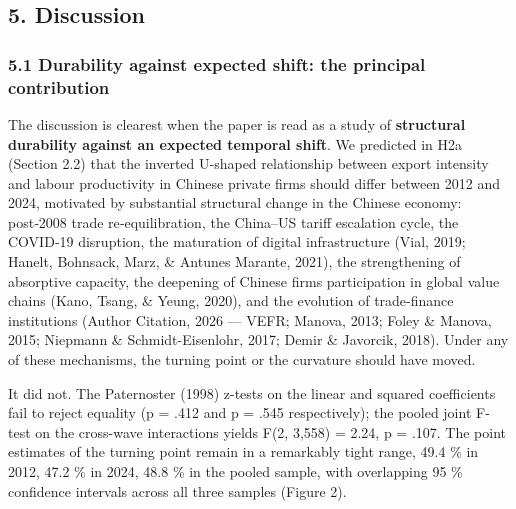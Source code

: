 \documentclass[12pt,a4paper]{article}
\begin{document}
\hypertarget{5-discussion}{%
\subsection{5. Discussion}\label{5-discussion}}

\hypertarget{51-durability-against-expected-shift-the-principal-contribution}{%
\subsubsection{5.1 Durability against expected shift: the principal
contribution}\label{51-durability-against-expected-shift-the-principal-contribution}}

The discussion is clearest when the paper is read as a study of
\textbf{structural durability against an expected temporal shift}. We
predicted in H2a (Section 2.2) that the inverted U‑shaped relationship
between export intensity and labour productivity in Chinese private
firms should differ between 2012 and 2024, motivated by substantial
structural change in the Chinese economy: post‑2008 trade
re‑equilibration, the China--US tariff escalation cycle, the COVID‑19
disruption, the maturation of digital infrastructure (Vial, 2019;
Hanelt, Bohnsack, Marz, \& Antunes Marante, 2021), the strengthening of
absorptive capacity, the deepening of Chinese firms\textquotesingle{}
participation in global value chains (Kano, Tsang, \& Yeung, 2020), and
the evolution of trade-finance institutions (Author Citation, 2026 ---
VEFR; Manova, 2013; Foley \& Manova, 2015; Niepmann \&
Schmidt-Eisenlohr, 2017; Demir \& Javorcik, 2018). Under any of these
mechanisms, the turning point or the curvature should have moved.

It did not. The Paternoster (1998) z-tests on the linear and squared
coefficients fail to reject equality (p = .412 and p = .545
respectively); the pooled joint F-test on the cross-wave interactions
yields F(2, 3,558) = 2.24, p = .107. The point estimates of the turning
point remain in a remarkably tight range, 49.4 \% in 2012, 47.2 \% in
2024, 48.8 \% in the pooled sample, with overlapping 95 \% confidence
intervals across all three samples (Figure 2).
\end{document}
